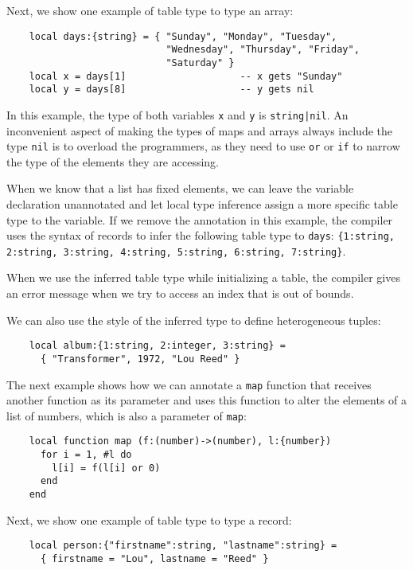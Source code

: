 Next, we show one example of table type to type an array:
\begin{verbatim}
    local days:{string} = { "Sunday", "Monday", "Tuesday",
                            "Wednesday", "Thursday", "Friday",
                            "Saturday" }
    local x = days[1]                    -- x gets "Sunday"
    local y = days[8]                    -- y gets nil
\end{verbatim}

In this example, the type of both variables \texttt{x} and \texttt{y}
is \texttt{string|nil}.
An inconvenient aspect of making the types of maps and arrays always
include the type \texttt{nil} is to overload the programmers,
as they need to use \texttt{or} or \texttt{if} to narrow the type of
the elements they are accessing. 

When we know that a list has fixed elements, we can leave the
variable declaration unannotated and let local type inference assign
a more specific table type to the variable.
If we remove the annotation in this example, the compiler uses the
syntax of records to infer the following table type to \texttt{days}:
\texttt{\{1:string, 2:string, 3:string, 4:string, 5:string, 6:string, 7:string\}}.

When we use the inferred table type while initializing a table, the
compiler gives an error message when we try to access an index that
is out of bounds.

We can also use the style of the inferred type to define heterogeneous
tuples:
\begin{verbatim}
    local album:{1:string, 2:integer, 3:string} =
      { "Transformer", 1972, "Lou Reed" }
\end{verbatim}

The next example shows how we can annotate a \texttt{map} function
that receives another function as its parameter and uses this
function to alter the elements of a list of numbers, which is
also a parameter of \texttt{map}:
\begin{verbatim}
    local function map (f:(number)->(number), l:{number})
      for i = 1, #l do
        l[i] = f(l[i] or 0)
      end
    end
\end{verbatim}

Next, we show one example of table type to type a record:
\begin{verbatim}
    local person:{"firstname":string, "lastname":string} =
      { firstname = "Lou", lastname = "Reed" } 
\end{verbatim}

